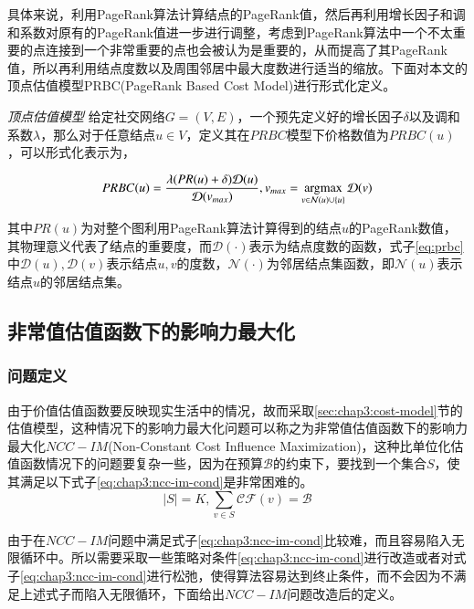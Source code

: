 具体来说，利用PageRank算法计算结点的PageRank值，然后再利用增长因子和调和系数对原有的PageRank值进一步进行调整，考虑到PageRank算法中一个不太重要的点连接到一个非常重要的点也会被认为是重要的，从而提高了其PageRank值，所以再利用结点度数以及周围邻居中最大度数进行适当的缩放。下面对本文的顶点估值模型PRBC(PageRank Based Cost Model)进行形式化定义。
\begin{definition}
\emph{顶点估值模型}
给定社交网络$G=(V, E)$，一个预先定义好的增长因子$\delta$以及调和系数$\lambda$，那么对于任意结点$u \in V$，定义其在$PRBC$模型下价格数值为$PRBC(u)$，可以形式化表示为，

\begin{equation}
\label{eq:prbc}
PRBC(u) = \frac{\lambda(PR(u) + \delta) \mathcal{D}(u)}{\mathcal{D}(v_{max})},v_{max} = \mathop{\rm argmax} \limits_{v \in \mathcal{N}(u) \cup \{u\}}\mathcal{D}(v)
\end{equation}

其中$PR(u)$为对整个图利用PageRank算法计算得到的结点$u$的PageRank数值，其物理意义代表了结点的重要度，而$\mathcal{D}(\cdot)$表示为结点度数的函数，式子\ref{eq:prbc}中$\mathcal{D}(u), \mathcal{D}(v)$表示结点$u, v$的度数，$\mathcal{N}(\cdot)$为邻居结点集函数，即$\mathcal{N}(u)$表示结点$u$的邻居结点集。
\end{definition}


\subsection{非常值估值函数下的影响力最大化}
\subsubsection{问题定义}
由于价值估值函数要反映现实生活中的情况，故而采取\ref{sec:chap3:cost-model}节的估值模型，这种情况下的影响力最大化问题可以称之为非常值估值函数下的影响力最大化$NCC-IM$(Non-Constant Cost Influence Maximization)，这种比单位化估值函数情况下的问题要复杂一些，因为在预算$\mathcal{B}$的约束下，要找到一个集合$S$，使其满足以下式子\ref{eq:chap3:ncc-im-cond}是非常困难的。
\begin{equation}
\label{eq:chap3:ncc-im-cond}
|S|=K, \sum_{v \in S} \mathcal{CF}(v) = \mathcal{B}
\end{equation}


由于在$NCC-IM$问题中满足式子\ref{eq:chap3:ncc-im-cond}比较难，而且容易陷入无限循环中。所以需要采取一些策略对条件\ref{eq:chap3:ncc-im-cond}进行改造或者对式子\ref{eq:chap3:ncc-im-cond}进行松弛，使得算法容易达到终止条件，而不会因为不满足上述式子而陷入无限循环，下面给出$NCC-IM$问题改造后的定义。


